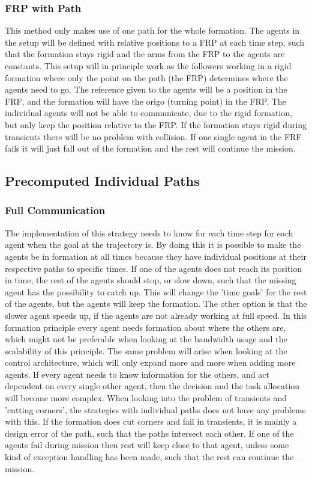 \subsubsection{\ac{FRP} with Path}
This method only makes use of one path for the whole formation. The agents in the setup will be defined with relative positions to a \ac{FRP} at each time step, such that the formation stays rigid and the arms from the \ac{FRP} to the agents are constants. This setup will in principle work as the followers working in a rigid formation where only the point on the path (the \ac{FRP}) determines where the agents need to go. The reference given to the agents will be a position in the \ac{FRF}, and the formation will have the origo (turning point) in the \ac{FRP}. The individual agents will not be able to communicate, due to the rigid formation, but only keep the position relative to the \ac{FRP}. If the formation stays rigid during transients there will be no problem with collision. If one single agent in the \ac{FRF} fails it will just fall out of the formation and the rest will continue the mission.

\subsection{Precomputed Individual Paths}
\subsubsection{Full Communication}
The implementation of this strategy needs to know for each time step for each agent when the goal at the trajectory is. By doing this it is possible to make the agents be in formation at all times because they have individual positions at their respective paths to specific times. If one of the agents does not reach its position in time, the rest of the agents should stop, or slow down, such that the missing agent has the possibility to catch up. This will change the 'time goals' for the rest of the agents, but the agents will keep the formation. The other option is that the slower agent speeds up, if the agents are not already working at full speed. In this formation principle every agent needs formation about where the others are, which might not be preferable when looking at the bandwidth usage and the scalability of this principle. The same problem will arise when looking at the control architecture, which will only expand more and more when adding more agents. If every agent needs to know information for the others, and act dependent on every single other agent, then the decision and the task allocation will become more complex. When looking into the problem of transients and 'cutting corners', the strategies with individual paths does not have any problems with this. If the formation does cut corners and fail in transients, it is mainly a design error of the path, such that the paths intersect each other. If one of the agents fail during mission then rest will keep close to that agent, unless some kind of exception handling has been made, such that the rest can continue the mission.

